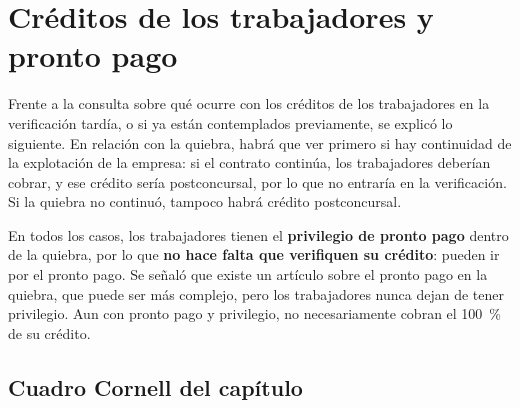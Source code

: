 \documentclass[12pt,oneside]{book}
\begin{document}
\section{Créditos de los trabajadores y pronto pago}

Frente a la consulta sobre qué ocurre con los créditos de los trabajadores en la verificación tardía, o si ya están contemplados previamente, se explicó lo siguiente. En relación con la quiebra, habrá que ver primero si hay continuidad de la explotación de la empresa: si el contrato continúa, los trabajadores deberían cobrar, y ese crédito sería postconcursal, por lo que no entraría en la verificación. Si la quiebra no continuó, tampoco habrá crédito postconcursal.

En todos los casos, los trabajadores tienen el \textbf{privilegio de pronto pago} dentro de la quiebra, por lo que \textbf{no hace falta que verifiquen su crédito}: pueden ir por el pronto pago. Se señaló que existe un artículo sobre el pronto pago en la quiebra, que puede ser más complejo, pero los trabajadores nunca dejan de tener privilegio. Aun con pronto pago y privilegio, no necesariamente cobran el 100~\% de su crédito.

\subsection*{Cuadro Cornell del capítulo}
\end{document}
